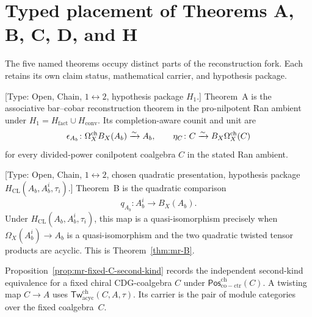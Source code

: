 \section{Typed placement of Theorems A, B, C, D, and H}
\label{sec:mr-corollaries}

The five named theorems occupy distinct parts of the
reconstruction fork.  Each retains its own claim status, mathematical
carrier, and hypothesis package.

\begin{corollary}
\label{cor:mr-A}
\textup{[Type: Open, Chain, $1\leftrightarrow 2$, hypothesis package
$H_1$.]}
Theorem~A is the associative bar--cobar reconstruction theorem in the
pro-nilpotent Ran ambient under
$H_1=H_{\mathrm{fact}}\cup H_{\mathrm{conv}}$.  Its
completion-aware counit and unit are
\[
 \epsilon_{A_b}\colon\Omega^{\mathrm{ch}}_XB_X(A_b)\xrightarrow{\sim}A_b,
 \qquad
 \eta_C\colon C\xrightarrow{\sim}B_X\Omega^{\mathrm{ch}}_X(C)
\]
for every divided-power conilpotent coalgebra $C$ in the stated Ran
ambient.
\end{corollary}

\begin{corollary}
\label{cor:mr-B}
\textup{[Type: Open, Chain, $1\leftrightarrow2$, chosen quadratic
presentation, hypothesis package
$H_{\mathrm{CL}}(A_b,A_b^i,\tau_i)$.]}
Theorem~B is the quadratic comparison
\[
 q_{A_b}\colon A_b^i\longrightarrow B_X(A_b).
\]
Under $H_{\mathrm{CL}}(A_b,A_b^i,\tau_i)$, this map is a
quasi-isomorphism precisely
when $\Omega_X(A_b^i)\to A_b$ is a quasi-isomorphism and the two
quadratic twisted tensor products are acyclic.  This is
Theorem~\ref{thm:mr-B}.
\end{corollary}

\begin{remark}
\label{rem:mr-fixed-C-placement}
Proposition~\ref{prop:mr-fixed-C-second-kind} records the independent
second-kind equivalence for a fixed chiral CDG-coalgebra $C$ under
$\mathsf{Pos}^{\mathrm{ch}}_{\mathrm{co-ctr}}(C)$.  A twisting map
$C\to A$ uses
$\mathsf{Tw}^{\mathrm{ch}}_{\mathrm{acyc}}(C,A,\tau)$.
Its carrier is the pair of module categories over the fixed
coalgebra~$C$.
\end{remark}

